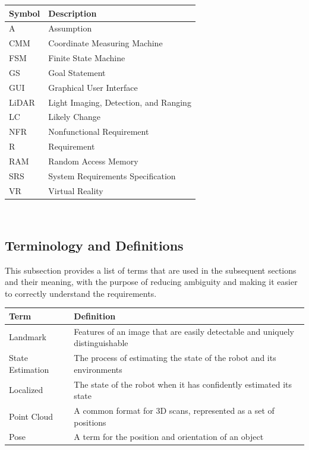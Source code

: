 \documentclass[12pt]{article}
\begin{document}
\renewcommand{\arraystretch}{1.2}
\begin{tabular}{l l} 
  \toprule		
  \textbf{Symbol} & \textbf{Description}\\
  \midrule 
  A & Assumption\\
  CMM & Coordinate Measuring Machine\\
  FSM & Finite State Machine\\
  GS & Goal Statement\\
  GUI & Graphical User Interface\\
  LiDAR & Light Imaging, Detection, and Ranging\\
  LC & Likely Change\\
  NFR & Nonfunctional Requirement\\
  R & Requirement\\
  RAM & Random Access Memory\\
  SRS & System Requirements Specification\\
  VR & Virtual Reality\\
  \bottomrule
\end{tabular}\\


\subsection{Terminology and Definitions}

This subsection provides a list of terms that are used in the subsequent sections and their meaning, with the purpose of reducing ambiguity and making it easier to correctly understand the requirements.
\newline
\\
\noindent
\begin{tabularx}{\textwidth}{p{4cm}X}
\toprule {\bf Term} & {\bf Definition}\\
\midrule
Landmark & Features of an image that are easily detectable and uniquely distinguishable\\
State Estimation & The process of estimating the state of the robot and its environments\\
Localized & The state of the robot when it has confidently estimated its state\\
Point Cloud & A common format for 3D scans, represented as a set of positions\\
Pose & A term for the position and orientation of an object\\
\bottomrule
\end{tabularx}
\end{document}
